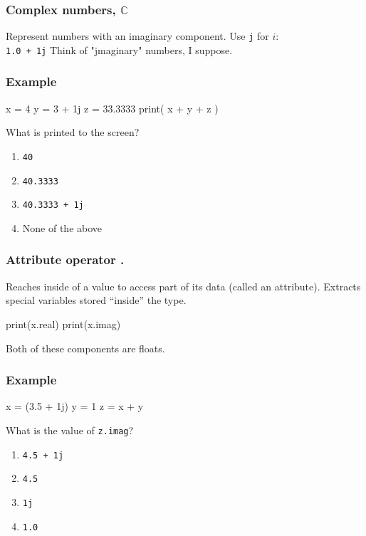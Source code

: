 \documentclass[11pt]{beamer}
\begin{document}
\begin{frame}
  \frametitle{Complex numbers, $\mathbb{C}$}
  \Enlarge

  \begin{itemize}
  \myitem  Represent numbers with an imaginary component.
  \myitem  Use \texttt{j} for $i$: \\
    \textcolor{CS101GradBot}{\texttt{1.0 + 1j}}
  \myitem  Think of "jmaginary" numbers, I suppose.
  \end{itemize}
\end{frame}

\begin{frame}[fragile]
  \frametitle{Example}
  \Enlarge

  \begin{semiverbatim}
x = 4
y = 3 + 1j
z = 33.3333
print( x + y + z )
  \end{semiverbatim}
  What is printed to the screen?
  \begin{enumerate}[label=\Alph*]
  \item  \texttt{40}
  \item  \texttt{40.3333}
  \item  \texttt{40.3333 + 1j}
  \item  None of the above
  \end{enumerate}
\end{frame}

\begin{frame}
  \frametitle{Attribute operator \textbf{.}}
  \Enlarge

  \begin{itemize}
  \myitem  Reaches inside of a value to access part of its data (called an attribute).
  \myitem  Extracts special variables stored “inside” the type.
    \begin{semiverbatim}
print(x.real)
print(x.imag)
    \end{semiverbatim}
  \myitem  Both of these components are floats.
  \end{itemize}
\end{frame}

\begin{frame}[fragile]
  \frametitle{Example}
  \Enlarge

  \begin{semiverbatim}
x = (3.5 + 1j)
y = 1
z = x + y
  \end{semiverbatim}
  What is the value of \texttt{z.imag}?
  \begin{enumerate}[label=\Alph*]
  \item  \texttt{4.5 + 1j}
  \item  \texttt{4.5}
  \item  \texttt{1j}
  \item  \texttt{1.0}
  \end{enumerate}
\end{frame}
\end{document}
